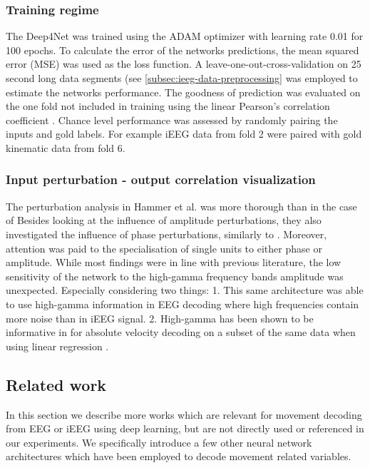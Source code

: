 \subsubsection{Training regime}
The Deep4Net was trained using the ADAM optimizer \cite{kingma-adam-2017} with learning rate 0.01 for 100 epochs.
To calculate the error of the networks predictions, the mean squared error (MSE) was used as the loss function.
A leave-one-out-cross-validation on 25 second long data segments (see \ref{subsec:ieeg-data-preprocessing} was employed to estimate the networks performance.
The goodness of prediction was evaluated on the one fold not included in training using the linear Pearson's correlation coefficient \cite{pearson-vii-1895}.
Chance level performance was assessed by randomly pairing the inputs and gold labels. For example iEEG data from fold 2 were paired with gold kinematic data from fold 6.

\subsubsection{Input perturbation - output correlation visualization}
The perturbation analysis in Hammer et al. was more thorough than in the case of \cite{schirrmeister-deep-2017} 
Besides looking at the influence of amplitude perturbations, they also investigated the influence of phase perturbations, similarly to \cite{hartmann-hierarchical-2018}.
Moreover, attention was paid to the specialisation of single units to either phase or amplitude.
While most findings were in line with previous literature, the low sensitivity of the network to the high-gamma frequency bands amplitude was unexpected.  
Especially considering two things: 
1. This same architecture was able to use high-gamma information in EEG decoding where high frequencies contain more noise than in iEEG signal.
2. High-gamma has been shown to be informative in for absolute velocity decoding on a subset of the same data when using linear regression \cite{hammer-predominance-2016}.

\subsection{Related work}
In this section we describe more works which are relevant for movement decoding from EEG or iEEG using deep learning, but are not directly used or referenced in our experiments.
We specifically introduce a few other neural network architectures which have been employed to decode movement related variables. \\


